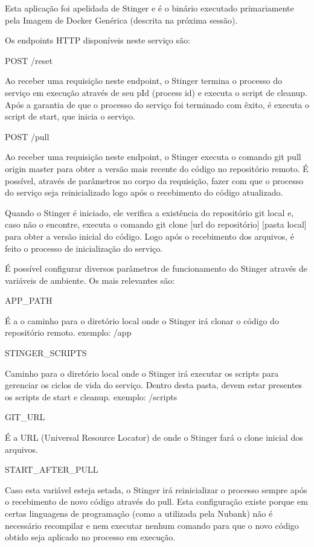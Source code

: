 \documentclass[]{politex}
\begin{document}
	Esta aplicação foi apelidada de Stinger e é o binário executado primariamente pela Imagem de Docker Genérica (descrita na próxima sessão).
	
	Os endpoints HTTP disponíveis neste serviço são:

	POST /reset
	
	Ao receber uma requisição neste endpoint, o Stinger termina o processo do serviço em execução através de seu pId (process id) e executa o script de cleanup. Após a garantia de que o processo do serviço foi terminado com êxito, é executa o script de start, que inicia o serviço.
	
	POST /pull
	
	Ao receber uma requisição neste endpoint, o Stinger executa o comando git pull origin master para obter a versão mais recente do código no repositório remoto. É possível, através de parâmetros no corpo da requisição, fazer com que o processo do serviço seja reinicializado logo após o recebimento do código atualizado.

	Quando o Stinger é iniciado, ele verifica a existência do repositório git local e, caso não o encontre, executa o comando git clone [url do repositório] [pasta local] para obter a versão inicial do código. Logo após o recebimento dos arquivos, é feito o processo de inicialização do serviço.

	É possível configurar diversos parâmetros de funcionamento do Stinger através de variáveis de ambiente. Os mais relevantes são:
	
	APP\_PATH
	
	É a o caminho para o diretório local onde o Stinger irá clonar o código do repositório remoto.
	exemplo: /app


	STINGER\_SCRIPTS
	
	Caminho para o diretório local onde o Stinger irá executar os scripts para gerenciar os ciclos de vida do serviço. Dentro desta pasta, devem estar presentes os scripts de start e cleanup.
	exemplo: /scripts
	
	GIT\_URL
	
	É a URL (Universal Resource Locator) de onde o Stinger fará o clone inicial dos arquivos.
	
	START\_AFTER\_PULL
	
	Caso esta variável esteja setada, o Stinger irá reinicializar o processo sempre após o recebimento de novo código através do pull. Esta configuração existe porque em certas linguagens de programação (como a utilizada pela Nubank) não é necessário recompilar e nem executar nenhum comando para que o novo código obtido seja aplicado no processo em execução.
\end{document}
